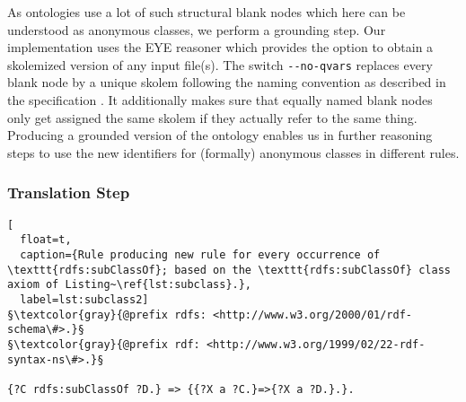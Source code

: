 As \owl ontologies use a lot of such structural blank nodes which here can be understood as anonymous classes, we perform a grounding step.
Our implementation uses the EYE reasoner which provides the option to obtain a skolemized version of any input
\nthree file(s). 
The switch \verb!--no-qvars! replaces every blank node by a unique skolem \iri following the naming convention as described in the \rdf specification \cite{rdf}.
It additionally makes sure that equally named blank nodes only get assigned the same skolem \iri if they actually refer to 
the same thing. Producing a grounded version of the ontology enables us in further reasoning steps to use the 
new identifiers for (formally) anonymous classes in different rules.

\subsubsection{Translation Step}

 \begin{lstlisting}[
  float=t,
  caption={Rule producing new rule for every occurrence of \texttt{rdfs:subClassOf}; based on the \texttt{rdfs:subClassOf} class axiom of Listing~\ref{lst:subclass}.},
  label=lst:subclass2]
§\textcolor{gray}{@prefix rdfs: <http://www.w3.org/2000/01/rdf-schema\#>.}§
§\textcolor{gray}{@prefix rdf: <http://www.w3.org/1999/02/22-rdf-syntax-ns\#>.}§

{?C rdfs:subClassOf ?D.} => {{?X a ?C.}=>{?X a ?D.}.}.
\end{lstlisting}



